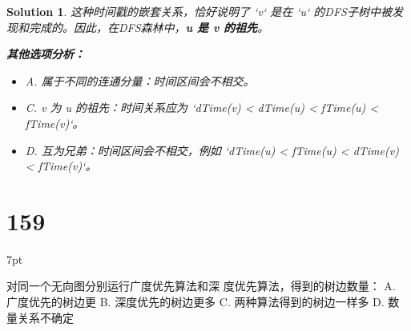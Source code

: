 \documentclass[UTF8]{report}
\newtheorem{solution}{Solution}
\theoremstyle{MyLineTheoremStyle} %
\theoremstyle{MyBlockTheoremStyle} %
\theoremstyle{MySubsubsectionStyle} %
\newenvironment{graybox}{%
        \def\FrameCommand{%
        \hspace{1pt}%
        {\color{gray}\small \vrule width 2pt}%
        {\color{graybox_color}\vrule width 4pt}%
        \colorbox{graybox_color}%
        }%
        \MakeFramed{\advance\hsize-\width\FrameRestore}%
        \noindent\hspace{-4.55pt}%
        \begin{adjustwidth}{}{7pt}%
        \vspace{2pt}\vspace{2pt}%
        }
        {%
        \vspace{2pt}\end{adjustwidth}\endMakeFramed%
        }
\begin{document}
\begin{solution}
这种时间戳的嵌套关系，恰好说明了 `v` 是在 `u` 的DFS子树中被发现和完成的。因此，在DFS森林中，\textbf{u 是 v 的祖先}。

\textbf{其他选项分析：}
\begin{itemize}
    \item A. 属于不同的连通分量：时间区间会不相交。
    \item C. v 为 u 的祖先：时间关系应为 `dTime(v) < dTime(u) < fTime(u) < fTime(v)`。
    \item D. 互为兄弟：时间区间会不相交，例如 `dTime(u) < fTime(u) < dTime(v) < fTime(v)`。
\end{itemize}
\end{solution}


\section*{159}
\begin{graybox}
对同一个无向图分别运行广度优先算法和深
度优先算法，得到的树边数量：
A. 广度优先的树边更
B. 深度优先的树边更多
C. 两种算法得到的树边一样多
D. 数量关系不确定
\end{graybox}
\end{document}
